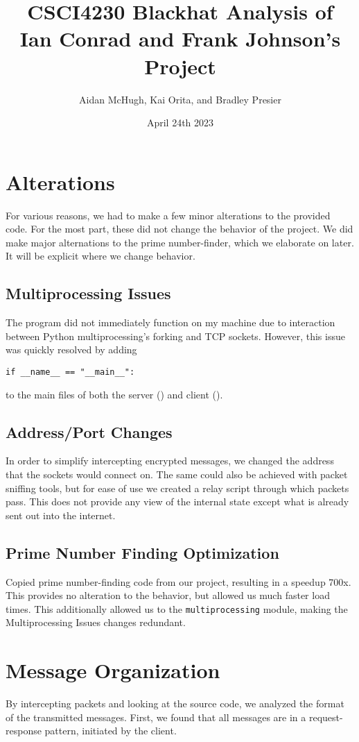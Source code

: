 \documentclass{article}
\title{CSCI4230 Blackhat Analysis of \\ Ian Conrad and Frank Johnson's Project}
\author{Aidan McHugh, Kai Orita, and Bradley Presier}
\date{April 24th 2023}
\newcommand{\code}[1]{\tcbox[
    on line,
    colback=codebackground, boxsep=2pt,
    colframe=white, boxrule=0pt,
    top=0pt, bottom=0pt, left=0pt, right=0pt
]{\texttt{#1}}}
\newcommand{\codebox}[1]{\begin{tcolorbox}[
    colback=codebackground, boxsep=2pt,
    colframe=white, boxrule=0pt,
    top=0pt, bottom=0pt, left=0pt, right=0pt
]\texttt{#1}
\end{tcolorbox}}
\begin{document}
\maketitle
\newpage
\tableofcontents
\newpage

\section{Alterations}
For various reasons, we had to make a few minor alterations to the provided code. For the most part, these did not change the behavior of the project. We did make major alternations to the prime number-finder, which we elaborate on later. It will be explicit where we change behavior.

\subsection{Multiprocessing Issues}
The program did not immediately function on my machine due to interaction between Python multiprocessing's forking and TCP sockets.
However, this issue was quickly resolved by adding
\codebox{if \_\_name\_\_ == "\_\_main\_\_":}
to the main files of both the server (\code{SERVER\_main.py}) and client (\code{CLIENT\_main.py}).

\subsection{Address/Port Changes}
In order to simplify intercepting encrypted messages, we changed the address that the sockets would connect on.
The same could also be achieved with packet sniffing tools,
but for ease of use we created a relay script through which packets pass.
This does not provide any view of the internal state except what is already sent out into the internet.

\subsection{Prime Number Finding Optimization}
Copied prime number-finding code from our project, resulting in a speedup 700x.
This provides no alteration to the behavior, but allowed us much faster load times.
This additionally allowed us to the \texttt{multiprocessing} module, making the Multiprocessing Issues changes redundant.

\pagebreak[3]
\section{Message Organization}
By intercepting packets and looking at the source code, we analyzed the format of the transmitted messages. First, we found that all messages are in a request-response pattern, initiated by the client.
\pagebreak[2]
\end{document}
